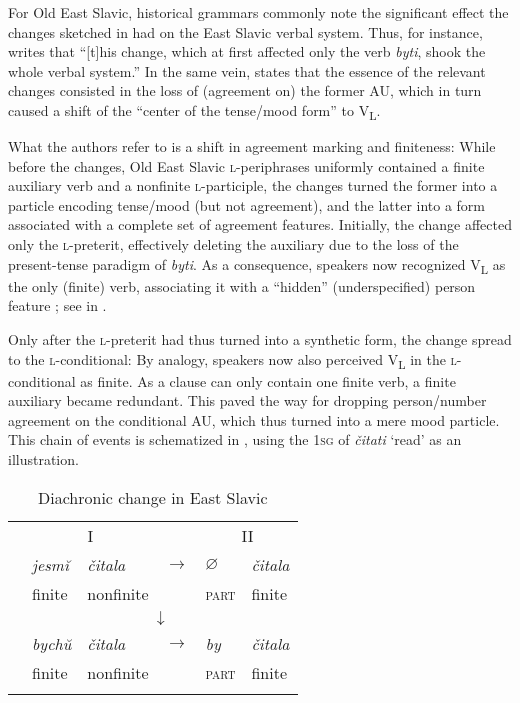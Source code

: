 \documentclass[output=paper]{langscibook}
\begin{document}
For Old East Slavic, historical grammars commonly note the significant effect the changes sketched in  had on the East Slavic verbal system. Thus, for instance, \citet[193]{Issatchenko1940} writes that ``[t]his change, which at first affected only the verb \textit{byti}, shook the whole verbal system.'' In the same vein, \citet[395]{Ivanov1964} states that the essence of the relevant changes consisted in the loss of (agreement on) the former AU, which in turn caused a shift of the ``center of the tense/mood form'' to V\textsubscript{L}. 

What the authors refer to is a shift in agreement marking and finiteness: While before the changes, Old East Slavic \textsc{l-}periphrases uniformly contained a finite auxiliary verb and a nonfinite \textsc{l-}participle, the changes turned the former into a particle encoding tense/mood (but not agreement), and the latter into a form associated with a complete set of agreement features. Initially, the change affected only the \textsc{l-}preterit, effectively deleting the auxiliary due to the loss of the present-tense paradigm of \textit{byti}. As a consequence, speakers now recognized V\textsubscript{L} as the only (finite) verb, associating it with a ``hidden'' (underspecified) person feature \citep[88]{Junghanns1995}; see  in . 

Only after the \textsc{l-}preterit had thus turned into a synthetic form, the change spread to the \textsc{l-}conditional: By analogy, speakers now also perceived V\textsubscript{L} in the \textsc{l-}conditional as finite. As a clause can only contain one finite verb, a finite auxiliary became redundant. This paved the way for dropping person/number agreement on the conditional AU, which thus turned into a mere mood particle. This chain of events is schematized in , using the \textsc{1sg} of \textit{čitati} `read' as an illustration.

\begin{table}
\begin{tabular}{lllcll}
\lsptoprule
 & \multicolumn{2}{c}{I} & & \multicolumn{2}{c}{II} \\\addlinespace
\multirow{2}{*}{\textsc{l-}preterit:} & \textit{jesmĭ} & \textit{čitala} & $\rightarrow$ & $\varnothing$ & \textit{čitala} \\
 & {\small finite} & {\small nonfinite} & & {\small \textsc{part} } & {\small finite} \\\addlinespace
 & \multicolumn{5}{c}{$\downarrow$} \\\addlinespace
\multirow{2}{*}{\textsc{l-}conditional:} & \textit{bychŭ} & \textit{čitala} & $\rightarrow$ & \textit{by} & \textit{čitala} \\
 & {\small finite} & {\small nonfinite} & & {\small \textsc{part} } & {\small finite} \\
 \lspbottomrule
\end{tabular}
\caption{Diachronic change in East Slavic}
\label{pitsch:tab:change_EastSlavic}
\end{table}
\end{document}
